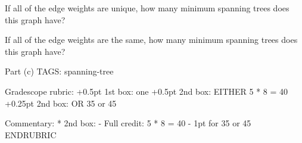 \begin{parts}
If all of the edge weights are unique, how many minimum spanning trees
does this graph have?

\medskip
\begin{framed}
\medskip
{}
\end{framed}

\medskip
If all of the edge weights are the same, how many minimum spanning
trees does this graph have?

\medskip
\begin{framed}
\medskip
{}
\end{framed}

\RUBRIC
Part (c)
TAGS: spanning-tree

Gradescope rubric:
+0.5pt  1st box: one
+0.5pt  2nd box: EITHER 5 * 8 = 40
+0.25pt 2nd box:     OR 35 or 45

Commentary:
* 2nd box:
  - Full credit: 5 * 8 = 40
  - 1pt for 35 or 45
ENDRUBRIC




\end{parts}
